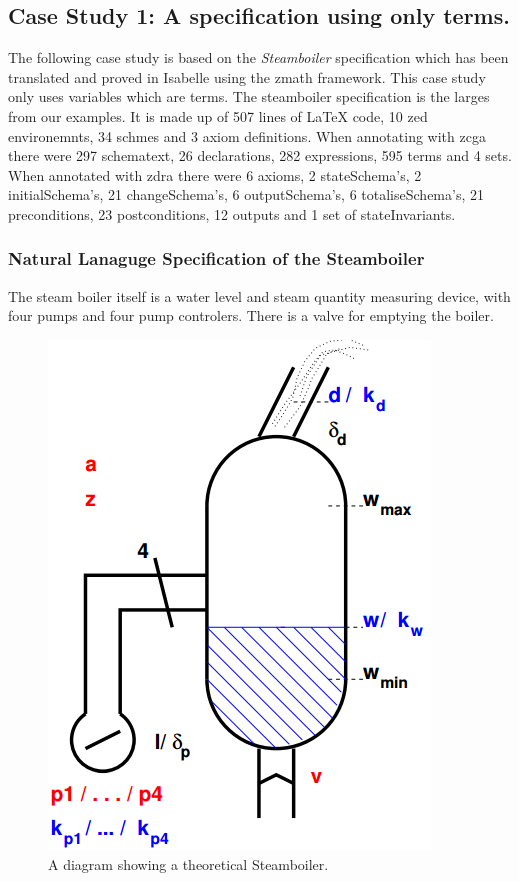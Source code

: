 \subsection{Case Study 1: A specification using only terms.}

The following case study is based on the \emph{Steamboiler} \cite{steamboilerslides} specification which has been translated and proved in Isabelle using the \gls{zmath} framework. This case study only uses variables which are terms. The steamboiler specification is the larges from our examples. It is made up of 507 lines of \LaTeX{} code, 10 zed environemnts, 34 schmes and 3 axiom definitions. When annotating with \gls{zcga} there were 297 schematext, 26 declarations, 282 expressions, 595 terms and 4 sets. When annotated with \gls{zdra} there were 6 axioms, 2 stateSchema's, 2 initialSchema's, 21 changeSchema's, 6 outputSchema's, 6 totaliseSchema's, 21 preconditions, 23 postconditions, 12 outputs and 1 set of stateInvariants.

\subsubsection{Natural Lanaguge Specification of the Steamboiler}

The steam boiler itself is a water level and steam quantity measuring device, with four pumps and four pump controlers. There is a valve for emptying the boiler.

\begin{figure}[H]
\centering
\includegraphics[scale=0.5]{Figures/Evaluation/steamboilerimage.png}
\caption{A diagram showing a theoretical Steamboiler. \label{fig:steamboiler}}
\end{figure}

